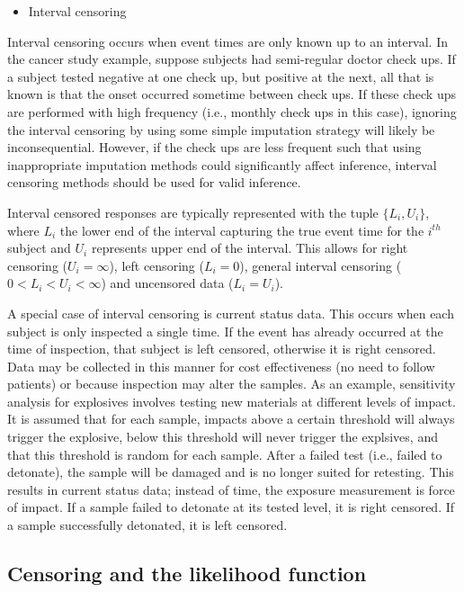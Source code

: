 \documentclass[a4paper]{article}
\begin{document}
  \begin{itemize}
  \item Interval censoring
  \end{itemize}

  Interval censoring occurs when event times are only known up to an interval. In the cancer study example, suppose subjects had semi-regular doctor check ups. If a subject tested negative at one check up, but positive at the next, all that is known is that the onset occurred sometime between check ups. If these check ups are performed with high frequency (i.e., monthly check ups in this case), ignoring the interval censoring by using some simple imputation strategy will likely be inconsequential. However, if the check ups are less frequent such that using inappropriate imputation methods could significantly affect inference, interval censoring methods should be used for valid inference. 
  
  Interval censored responses are typically represented with the tuple $\{L_i, U_i\}$, where $L_i$ the lower end of the interval capturing the true event time for the $i^{th}$ subject and $U_i$ represents upper end of the interval. This allows for right censoring ($U_i = \infty$), left censoring ($L_i = 0$), general interval censoring ($0 < L_i < U_i < \infty$) and uncensored data ($L_i = U_i$). 

  A special case of interval censoring is current status data. This occurs when each subject is only inspected a single time. If the event has already occurred at the time of inspection, that subject is left censored, otherwise it is right censored. Data may be collected in this manner for cost effectiveness (no need to follow patients) or because inspection may alter the samples. As an example, sensitivity analysis for explosives involves testing new materials at different levels of impact. It is assumed that for each sample, impacts above a certain threshold will always trigger the explosive, below this threshold will never trigger the explsives, and that this threshold is random for each sample. After a failed test (i.e., failed to detonate), the sample will be damaged and is no longer suited for retesting. This results in current status data; instead of time, the exposure measurement is force of impact. If a sample failed to detonate at its tested level, it is right censored. If a sample successfully detonated, it is left censored. 

  \subsection{Censoring and the likelihood function}
\end{document}
